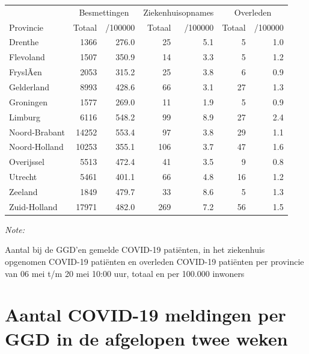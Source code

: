 \documentclass[
  english,
  man,floatsintext]{apa6}
\begin{document}
\begin{table}
\centering
\begin{threeparttable}
\begin{tabular}{lrrrrrr}
\toprule
\multicolumn{1}{c}{ } & \multicolumn{2}{c}{Besmettingen} & \multicolumn{2}{c}{Ziekenhuisopnames} & \multicolumn{2}{c}{Overleden} \\
\cmidrule(l{3pt}r{3pt}){2-3} \cmidrule(l{3pt}r{3pt}){4-5} \cmidrule(l{3pt}r{3pt}){6-7}
Provincie & Totaal & /100000 & Totaal & /100000 & Totaal & /100000\\
\midrule
Drenthe & 1366 & 276.0 & 25 & 5.1 & 5 & 1.0\\
Flevoland & 1507 & 350.9 & 14 & 3.3 & 5 & 1.2\\
FryslÃ¢n & 2053 & 315.2 & 25 & 3.8 & 6 & 0.9\\
Gelderland & 8993 & 428.6 & 66 & 3.1 & 27 & 1.3\\
Groningen & 1577 & 269.0 & 11 & 1.9 & 5 & 0.9\\
Limburg & 6116 & 548.2 & 99 & 8.9 & 27 & 2.4\\
Noord-Brabant & 14252 & 553.4 & 97 & 3.8 & 29 & 1.1\\
Noord-Holland & 10253 & 355.1 & 106 & 3.7 & 47 & 1.6\\
Overijssel & 5513 & 472.4 & 41 & 3.5 & 9 & 0.8\\
Utrecht & 5461 & 401.1 & 66 & 4.8 & 16 & 1.2\\
Zeeland & 1849 & 479.7 & 33 & 8.6 & 5 & 1.3\\
Zuid-Holland & 17971 & 482.0 & 269 & 7.2 & 56 & 1.5\\
\bottomrule
\end{tabular}
\begin{tablenotes}
\item \textit{Note: } 
\item Aantal bij de GGD’en gemelde COVID-19 patiënten, in het ziekenhuis opgenomen COVID-19 patiënten en overleden COVID-19 patiënten per provincie van 06 mei t/m 20 mei 10:00 uur, totaal en per 100.000 inwoners
\end{tablenotes}
\end{threeparttable}
\end{table}

\newpage

\hypertarget{aantal-covid-19-meldingen-per-ggd-in-de-afgelopen-twee-weken}{%
\section{Aantal COVID-19 meldingen per GGD in de afgelopen twee weken}\label{aantal-covid-19-meldingen-per-ggd-in-de-afgelopen-twee-weken}}
\end{document}
